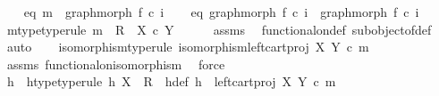 \begin{isabellebody}
\ \ \isamarkupfalse%
\ eq{}{\isacharcolon}{\kern0pt}\ {\isachardoublequoteopen}m\ {\isacharequal}{\kern0pt}\ graph{\isacharunderscore}{\kern0pt}morph\ f{}\ {\isasymcirc}\isactrlsub c\ i{}{\isachardoublequoteclose}\isanewline
\ \ \isamarkupfalse%
\ eq{}{\isacharcolon}{\kern0pt}\ {\isachardoublequoteopen}graph{\isacharunderscore}{\kern0pt}morph\ f{}\ {\isasymcirc}\isactrlsub c\ i{}\ {\isacharequal}{\kern0pt}\ graph{\isacharunderscore}{\kern0pt}morph\ f{}\ {\isasymcirc}\isactrlsub c\ i{}{\isachardoublequoteclose}\ \isanewline
\isanewline
\ \ \isamarkupfalse%
\ m{\isacharunderscore}{\kern0pt}type{\isacharbrackleft}{\kern0pt}type{\isacharunderscore}{\kern0pt}rule{\isacharbrackright}{\kern0pt}{\isacharcolon}{\kern0pt}\ {\isachardoublequoteopen}m\ {\isacharcolon}{\kern0pt}\ R\ {\isasymrightarrow}\ X\ {\isasymtimes}\isactrlsub c\ Y{\isachardoublequoteclose}\isanewline
\ \ \ \ \isamarkupfalse%
\ assms\ \isamarkupfalse%
\ functional{\isacharunderscore}{\kern0pt}on{\isacharunderscore}{\kern0pt}def\ subobject{\isacharunderscore}{\kern0pt}of{\isacharunderscore}{\kern0pt}def{}\ \isamarkupfalse%
\ auto\isanewline
\ \ \isamarkupfalse%
\ isomorphism{\isacharbrackleft}{\kern0pt}type{\isacharunderscore}{\kern0pt}rule{\isacharbrackright}{\kern0pt}{\isacharcolon}{\kern0pt}\ {\isachardoublequoteopen}isomorphism{\isacharparenleft}{\kern0pt}left{\isacharunderscore}{\kern0pt}cart{\isacharunderscore}{\kern0pt}proj\ X\ Y\ {\isasymcirc}\isactrlsub c\ m{\isacharparenright}{\kern0pt}{\isachardoublequoteclose}\isanewline
\ \ \ \ \isamarkupfalse%
\ assms\ functional{\isacharunderscore}{\kern0pt}on{\isacharunderscore}{\kern0pt}isomorphism\ \isamarkupfalse%
\ force\ \ \isanewline
\ \ \isamarkupfalse%
\ h\ \ h{\isacharunderscore}{\kern0pt}type{\isacharbrackleft}{\kern0pt}type{\isacharunderscore}{\kern0pt}rule{\isacharbrackright}{\kern0pt}{\isacharcolon}{\kern0pt}\ {\isachardoublequoteopen}h{\isacharcolon}{\kern0pt}\ X\ {\isasymrightarrow}\ R{\isachardoublequoteclose}\ \ h{\isacharunderscore}{\kern0pt}def{\isacharcolon}{\kern0pt}\ {\isachardoublequoteopen}h\ {\isacharequal}{\kern0pt}\ {\isacharparenleft}{\kern0pt}left{\isacharunderscore}{\kern0pt}cart{\isacharunderscore}{\kern0pt}proj\ X\ Y\ {\isasymcirc}\isactrlsub c\ m{\isacharparenright}{\kern0pt}\isactrlbold {\isasyminverse}{\isachardoublequoteclose}\isanewline

\end{isabellebody}
